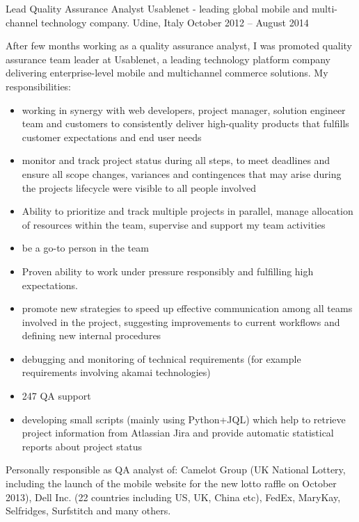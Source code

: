 \begin{cventries}
\cventry
{Lead Quality Assurance Analyst} 
{Usablenet - leading global mobile and multi-channel technology company.}
   {Udine, Italy}
{October 2012 -- August 2014}
   {
      After few months working as a quality assurance analyst, I was
      promoted 
   quality assurance team leader at Usablenet, a leading 
  technology platform  company delivering enterprise-level mobile and
  multichannel commerce solutions.
   My responsibilities:
   \begin{itemize}
\item 
  working in synergy with  web
   developers, project manager, solution engineer team and customers to
   consistently deliver high-quality
   products that fulfills customer expectations and end user needs
\item monitor and track project status during all steps, to meet deadlines
   and ensure all scope changes,
 variances and contingences that may arise during the 
 projects lifecycle were visible to all people involved
 \item 
   Ability to prioritize and track multiple projects in parallel,
    manage  allocation of resources within the team, supervise and support my team
    activities
 \item  be a go-to person in the team
 \item 
   Proven ability to work under pressure responsibly and fulfilling high
   expectations.
\item promote new strategies to speed up effective communication among all
   teams involved in the project, suggesting 
   improvements to current workflows and defining new internal procedures
\item debugging and monitoring of %
technical requirements (for example requirements involving
   akamai technologies)
\item 247 QA support 
   \item developing small scripts (mainly using Python+JQL) which help to retrieve project
 information from Atlassian Jira and provide automatic statistical reports about project status
 \end{itemize} 
   Personally responsible as QA analyst of:
   Camelot Group (UK National Lottery, including the
   launch of the mobile website for the new lotto raffle on October 2013), Dell Inc. (22 countries
   including US, UK, China etc), FedEx,
   MaryKay, Selfridges, Surfstitch and many others.
}
\end{cventries}
